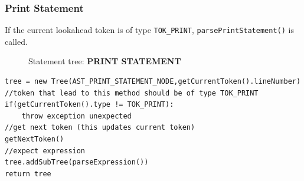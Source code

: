 \subsubsection{Print Statement}
\label{sec:print statement subtree}
If the current lookahead token is of type \verb!TOK_PRINT!, \verb!parsePrintStatement()! is called. 
\begin{figure}[H]
	\centering
	\caption{Statement tree: \textbf{PRINT STATEMENT}}
	\label{fig:Print statemment tree}
\end{figure}

\begin{lstlisting}[caption=PSEUDOCODE for building a print statement tree (\emph{printStatement()})]
tree = new Tree(AST_PRINT_STATEMENT_NODE,getCurrentToken().lineNumber)
//token that lead to this method should be of type TOK_PRINT
if(getCurrentToken().type != TOK_PRINT):
    throw exception unexpected 
//get next token (this updates current token)
getNextToken()
//expect expression
tree.addSubTree(parseExpression())
return tree
\end{lstlisting}
